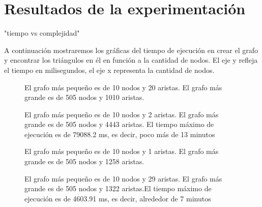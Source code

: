 \documentclass[%
    a4paper,%
    12pt,%
    twoside,%
    openright,%
    halfparskip,%
    cleardoubleempty,%
    bigheadings,%
    titlepage,%
    headsepline%
]{scrbook}
\begin{document}
\chapter{Resultados de la experimentación}
\label{sec:experimentación}
"tiempo vs complejidad"

A continuación mostraremos los gráficas del tiempo de ejecución en crear el grafo y encontrar los triángulos en él en función a la cantidad de nodos. El eje y refleja el tiempo en milisegundos, el eje x representa la cantidad de nodos. 

\begin{figure}
  \centering

  \caption{El grafo más pequeño es de 10 nodos y 20 aristas. El grafo más grande es de 505 nodos y 1010 aristas. }\label{fig:realWorld}
\end{figure}

\begin{figure}
  \centering

  \caption{El grafo más pequeño es de 10 nodos y 2 aristas. El grafo más grande es de 505 nodos y 4443 aristas. El tiempo máximo de ejecución es de 79088.2 ms, es decir, poco más de 13 minutos }\label{fig:erdos}
\end{figure}


\begin{figure}
  \centering

  \caption{El grafo más pequeño es de 10 nodos y 1 aristas. El grafo más grande es de 505 nodos y 1258 aristas. }\label{fig:gnp}
\end{figure}


\begin{figure}
  \centering

  \caption{El grafo más pequeño es de 10 nodos y 29 aristas. El grafo más grande es de 505 nodos y 1322 aristas.El tiempo máximo de ejecución es de 4603.91 ms, es decir, alrededor de 7 minutos }\label{fig:newman}
\end{figure}
\end{document}
